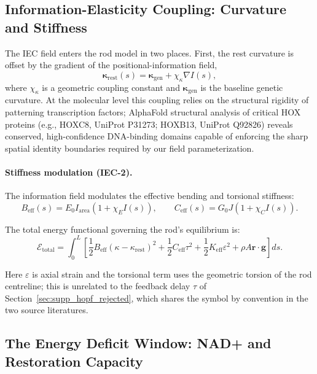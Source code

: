 \subsection{Information-Elasticity Coupling: Curvature and Stiffness}

The IEC field enters the rod model in two places. First, the rest curvature is offset by the gradient of the positional-information field,
\begin{equation}
\boldsymbol{\kappa}_{\mathrm{rest}}(s) = \boldsymbol{\kappa}_{\mathrm{gen}} + \chi_\kappa \nabla I(s),
\label{eq:kappa_rest_iec_supp}
\end{equation}
where $\chi_\kappa$ is a geometric coupling constant and $\boldsymbol{\kappa}_{\mathrm{gen}}$ is the baseline genetic curvature. At the molecular level this coupling relies on the structural rigidity of patterning transcription factors; AlphaFold structural analysis of critical HOX proteins (e.g., HOXC8, UniProt P31273; HOXB13, UniProt Q92826) reveals conserved, high-confidence DNA-binding domains capable of enforcing the sharp spatial identity boundaries required by our field parameterization.

\paragraph{Stiffness modulation (IEC-2).}
The information field modulates the effective bending and torsional stiffness:
\begin{equation}
B_{\mathrm{eff}}(s) = E_0 I_{\mathrm{area}} (1 + \chi_E I(s)), \qquad
C_{\mathrm{eff}}(s) = G_0 J (1 + \chi_C I(s)).
\label{eq:stiffness_modulation_supp}
\end{equation}

The total energy functional governing the rod's equilibrium is:
\begin{equation}
\mathcal{E}_{\mathrm{total}} = \int_0^L \left[ \frac{1}{2} B_{\mathrm{eff}}(\kappa - \kappa_{\mathrm{rest}})^2 + \frac{1}{2} C_{\mathrm{eff}} \tau^2 + \frac{1}{2} K_{\mathrm{eff}} \varepsilon^2 + \rho A \mathbf{r} \cdot \mathbf{g} \right] ds.
\label{eq:iec_energy_supp}
\end{equation}

Here $\varepsilon$ is axial strain and the torsional term uses the geometric torsion of the rod centreline; this is unrelated to the feedback delay $\tau$ of Section~\ref{sec:supp_hopf_rejected}, which shares the symbol by convention in the two source literatures.

\subsection{The Energy Deficit Window: NAD+ and Restoration Capacity}

